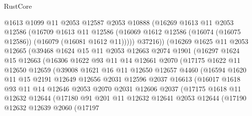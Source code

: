 \begin{lexlean}{RustCore}
\begin{coremodule}
              @1613
              @1099
              @11
              @2053
              @12587
              @2053
              @10888
              (@16269
                @1613
                @11
                @2053
                @12586
                (@16709
                  @1613
                  @11
                  @12586
                  (@16069 @1612 @12586 (@16074 (@16075 @12586)) (@16079 (@16081 @1612 @11)))))
              @37216))
          (@16269
            @1625
            @11
            @2053
            @12665
            (@39468
              @1624
              @15
              @11
              @2053
              @12663
              @2074
              @1901
              (@16297
                @1624
                @15
                @12663
                (@16306
                  @1622
                  @93
                  @11
                  @14
                  @12661
                  @2070
                  (@17175
                    @1622
                    @11
                    @12650
                    @12659
                    (@39008
                      @1621
                      @16
                      @11
                      @12650
                      @12657
                      @4460
                      (@16594
                        @1620
                        @11
                        @15
                        @2191
                        @12649
                        @12656
                        @2031
                        @12596
                        @2037
                        @16613
                        (@16017
                          @1618
                          @93
                          @11
                          @14
                          @12646
                          @2053
                          @2070
                          @2031
                          @12606
                          @2037
                          (@17175
                            @1618
                            @11
                            @12632
                            @12644
                            (@17180
                              @91
                              @201
                              @11
                              @12632
                              @12641
                              @2053
                              @12644
                              (@17190
                                @12632
                                @12639
                                @2060
                                (@17197

\end{coremodule}
\end{lexlean}

